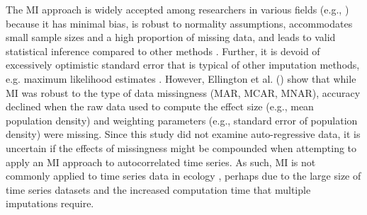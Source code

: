 The MI approach is widely accepted among researchers in various fields (e.g., \citep{van2018flexible, nakagawa_missing_2015}) because it has minimal bias, is robust to normality assumptions, accommodates small sample sizes and a high proportion of missing data, and leads to valid statistical inference compared to other methods \citep{kang2013prevention, tran2017missing, van2006imputation}. Further, it is devoid of excessively optimistic standard error that is typical of other imputation methods, e.g. maximum likelihood estimates \citep{van2018flexible, newman_missing_2014}. However, Ellington et al. (\citeyear{ellington_using_2015}) show that while MI was robust to the type of data missingness (MAR, MCAR, MNAR), accuracy declined when the raw data used to compute the effect size (e.g., mean population density) and weighting parameters (e.g., standard error of population density) were missing. Since this study did not examine auto-regressive data, it is uncertain if the effects of missingness  might be compounded when attempting to apply an MI approach to autocorrelated time series. As such, MI is not commonly applied to time series data in ecology \citep{hossie_confronting_2021}, perhaps due to the large size of time series datasets and the increased computation time that multiple imputations require. 

